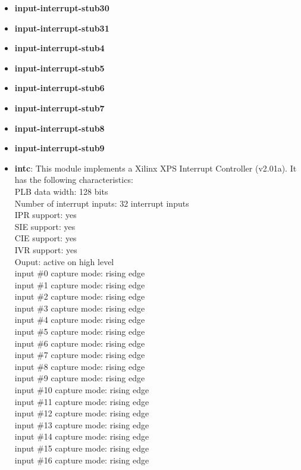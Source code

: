 \begin{itemize}
\item \textbf{input-interrupt-stub30}
\item \textbf{input-interrupt-stub31}
\item \textbf{input-interrupt-stub4}
\item \textbf{input-interrupt-stub5}
\item \textbf{input-interrupt-stub6}
\item \textbf{input-interrupt-stub7}
\item \textbf{input-interrupt-stub8}
\item \textbf{input-interrupt-stub9}
\item \textbf{intc}: This module implements a Xilinx XPS Interrupt Controller (v2.01a). It has the following characteristics:\\
PLB data width: 128 bits\\
Number of interrupt inputs: 32 interrupt inputs\\
IPR support: yes\\
SIE support: yes\\
CIE support: yes\\
IVR support: yes\\
Ouput: active on high level\\
input \#0 capture mode: rising edge\\
input \#1 capture mode: rising edge\\
input \#2 capture mode: rising edge\\
input \#3 capture mode: rising edge\\
input \#4 capture mode: rising edge\\
input \#5 capture mode: rising edge\\
input \#6 capture mode: rising edge\\
input \#7 capture mode: rising edge\\
input \#8 capture mode: rising edge\\
input \#9 capture mode: rising edge\\
input \#10 capture mode: rising edge\\
input \#11 capture mode: rising edge\\
input \#12 capture mode: rising edge\\
input \#13 capture mode: rising edge\\
input \#14 capture mode: rising edge\\
input \#15 capture mode: rising edge\\
input \#16 capture mode: rising edge\\

\end{itemize}
